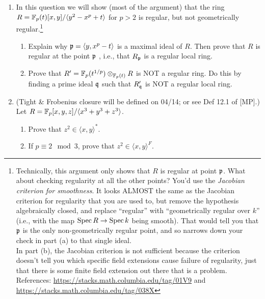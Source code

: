 \documentclass[11pt]{amsart}
\theoremstyle{definition}
\begin{document}
\begin{enumerate}[itemsep=5em]
\begin{enumerate}[itemsep=1em]
\item Let $(R,\mf m,k)$ be a local ring, and let $h:R\to S$ be a faithfully flat $R$-algebra map. Prove that $R\to S$ is pure.\footnote{Hint: Build a commutative square that incorporates an essential extension, the tensoring that flatness helps with, and the tensoring that purity helps with. Use faithfulness to get info about the remaining side.}


\end{enumerate}


\newpage

\item In this question we will show (most of the argument) that the ring $R=\mathbb{F}_p(t)[x,y]/\langle y^2-x^p+t\rangle$ for $p>2$ is regular, but not geometrically regular.\footnote{Technically, this argument only shows that $R$ is regular at point $\mathfrak{p}$. What about checking regularity at all the other points? You'd use the \emph{Jacobian criterion for smoothness}. It looks ALMOST the same as the Jacobian criterion for regularity that you are used to, but remove the hypothesis algebraically closed, and replace ``regular'' with ``geometrically regular over $k$'' (i.e., with the map $\operatorname{Spec} R \to \operatorname{Spec} k$ being smooth). That would tell you that $\mathfrak{p}$ is the only non-geometrically regular point, and so narrows down your check in part (a) to that single ideal.\\
In part (b), the Jacobian criterion is not sufficient because the criterion doesn't tell you which specific field extensions cause failure of regularity, just that there is some finite field extension out there that is a problem.\\
References: \url{https://stacks.math.columbia.edu/tag/01V9} and \url{https://stacks.math.columbia.edu/tag/038X}}
\begin{enumerate}
\item Explain why $\mathfrak{p} = \langle y, x^p-t\rangle$ is a maximal ideal of $R$. Then prove that $R$ is regular at the point $\mathfrak{p}$ , i.e., that $R_{\mathfrak{p}}$ is a regular local ring.


\item Prove that $R'=\mathbb{F}_p(t^{1/p})\otimes_{\mathbb{F}_p(t)} R$ is NOT a regular ring. Do this by finding a prime ideal $\mathfrak{q}$ such that $R'_{\mathfrak{q}}$ is NOT a regular local ring.


\end{enumerate}

\item (Tight \& Frobenius closure will be defined on 04/14; or see Def 12.1 of [MP].)\\
Let $R=\mathbb{F}_p[x,y,z]/\langle x^3+y^3+z^3\rangle$.

\begin{enumerate}
\item Prove that $z^2\in \langle x,y\rangle ^*$.


\item If $p\equiv 2 \mod 3$, prove that $z^2\in \langle x,y\rangle^F$.


\end{enumerate}

\end{enumerate}
\end{document}
